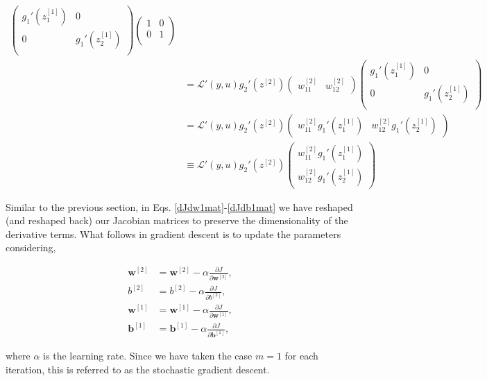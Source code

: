 \documentclass{article}
\begin{document}
\begin{align}
\begin{pmatrix}
g_1'(z_1^{[1]}) & 0 \\
0 & g_1'(z_2^{[1]}) \\
\end{pmatrix}
\begin{pmatrix}
1 & 0 \\
0 & 1 \\
\end{pmatrix} \nonumber \\
&= 
\mathcal{L}'(y,u)
g_2'(z^{[2]}) 
\begin{pmatrix}
w_{11}^{[2]} & w_{12}^{[2]} 
\end{pmatrix}
\begin{pmatrix}
g_1'(z_1^{[1]}) & 0 \\
0 & g_1'(z_2^{[1]}) \\
\end{pmatrix} \nonumber \\
&= 
\mathcal{L}'(y,u)
g_2'(z^{[2]}) 
\begin{pmatrix}
w_{11}^{[2]} g_1'(z_1^{[1]}) & w_{12}^{[2]} g_1'(z_2^{[1]}) 
\end{pmatrix} \nonumber \\
&\equiv 
\mathcal{L}'(y,u)
g_2'(z^{[2]}) 
\begin{pmatrix}
w_{11}^{[2]} g_1'(z_1^{[1]}) \\ w_{12}^{[2]} g_1'(z_2^{[1]}) 
\end{pmatrix}
\label{dJdb1mat}
\end{align}

Similar to the previous section, in Eqs. \eqref{dJdw1mat}-\eqref{dJdb1mat} we have reshaped (and reshaped back) our Jacobian matrices to preserve the dimensionality of the derivative terms. 
What follows in gradient descent is to update the parameters considering,

\begin{align}
\label{updatew2}
\textbf{w}^{[2]} &= \textbf{w}^{[2]} - \alpha \frac{\partial J}{\partial \textbf{w}^{[2]}}, \\
b^{[2]} &= b^{[2]} - \alpha \frac{\partial J}{\partial b^{[2]}}, \\
\textbf{w}^{[1]} &= \textbf{w}^{[1]} - \alpha \frac{\partial J}{\partial \textbf{w}^{[1]}}, \\
\textbf{b}^{[1]} &= \textbf{b}^{[1]} - \alpha \frac{\partial J}{\partial \textbf{b}^{[1]}},
\label{updateb1}
\end{align}

where $\alpha$ is the learning rate. Since we have taken the case $m=1$ for each iteration, this is referred to as the stochastic gradient descent.
\end{document}
